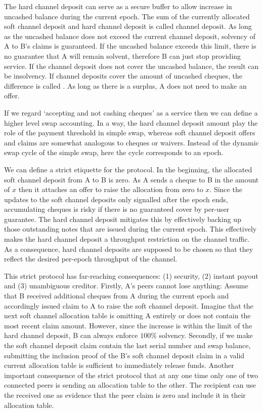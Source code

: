 The hard channel deposit can serve as a secure buffer to allow increase in uncashed balance during the current epoch.
The sum of the currently allocated soft channel deposit and hard channel deposit is called channel deposit.
As long as the uncashed balance does not exceed the current channel deposit, solvency of A to B's claims is guaranteed. If the uncashed balance exceeds this limit, there is no guarantee that A will remain solvent, therefore B can just stop providing service. If the channel deposit  does not cover the uncashed balance, the result can be insolvency. If channel deposits cover the amount of uncashed cheques, the difference is called . As long as there is a surplus, A does not need to make an offer.

If we regard `accepting and not cashing cheques' as a service then we can define a higher level swap accounting. In a way, the hard channel deposit amount play the role of the payment  threshold in simple swap, whereas soft channel deposit offers and claims are somewhat analogous to cheques or waivers.
Instead of the dynamic swap cycle of the simple swap, here the cycle corresponds to an epoch. 

We can define a strict etiquette for the protocol. In the beginning, the allocated soft channel deposit from A to B is zero. As A sends a cheque to B in the amount of $x$ then it attaches an offer to raise the allocation from zero to $x$. Since the updates to the soft channel deposits only signalled after the epoch ends, accumulating cheques is risky if there is no guaranteed cover by per-user guarantee.
The hard channel deposit mitigates this by effectively backing up those outstanding notes that are issued during the current epoch. This effectively makes the hard channel deposit a throughput restriction on the channel traffic.  As a consequence, hard channel deposits are supposed to be chosen so that they reflect the desired per-epoch throughput of the channel.

This strict protocol has far-reaching consequences: (1) security, (2) instant payout and (3) unambiguous creditor. Firstly, A's peers cannot lose anything: Assume that B received additional cheques from A during the current epoch and accordingly issued claim to A to raise the soft channel deposit.  Imagine that the next soft channel allocation table is omitting A entirely or does not contain the most recent claim amount. However, since the increase is within the limit of the hard channel deposit, B can always enforce $100\%$ solvency.
Secondly, if we make the soft channel deposit claim contain the last serial number and swap balance, submitting the inclusion proof of the B's soft channel deposit claim in a valid current allocation table is sufficient to immediately release funds. 
Another important consequence of the strict protocol that at any one time only one of two connected peers is sending an allocation table to the other. The recipient can use the received one as evidence that the peer claim is zero and include it in their allocation table. 

